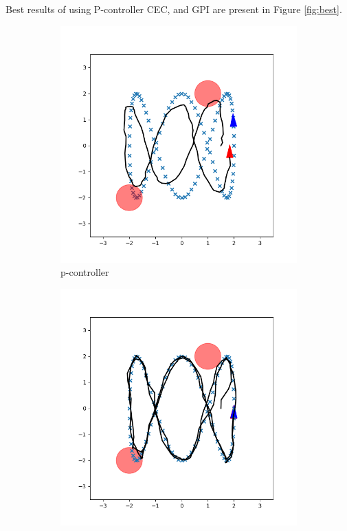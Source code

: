 \documentclass[conference]{IEEEtran}
\begin{document}
Best results of using P-controller CEC, and GPI are present in Figure \ref{fig:best}.
\begin{figure}
    \centering
    \begin{subfigure}[b]{0.3\textwidth}
        \includegraphics[width=\textwidth]{../fig/p_controller.png}
        \caption{p-controller}
        \label{fig:p-controller}
    \end{subfigure}
    \hfill
    \begin{subfigure}[b]{0.3\textwidth}
        \includegraphics[width=\textwidth]{../fig/trajectory.cec.png}

\end{subfigure}
\end{figure}
\end{document}
